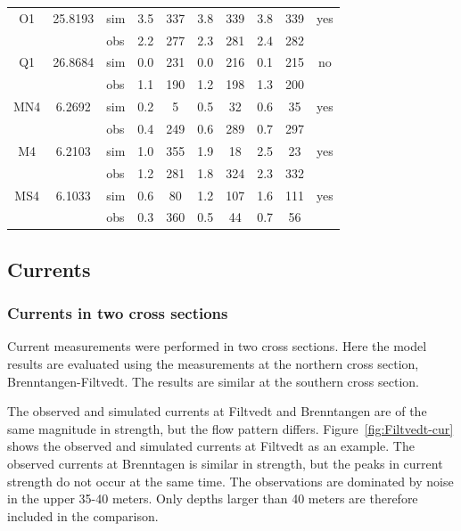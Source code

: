 \begin{table}[ht]
\begin{tabular}{|c|c|l|cc|cc|cc|c|}
\small O1   & 25.8193 	& sim & 3.5 & 337 & 3.8 & 339 & 3.8 & 339 & yes  \\
\small      &        	& obs & 2.2 & 277 & 2.3 & 281 & 2.4 & 282 &    \\
\small Q1   & 26.8684 	& sim & 0.0 & 231 & 0.0 & 216 & 0.1 & 215 & no   \\
\small      &        	& obs & 1.1 & 190 & 1.2 & 198 & 1.3 & 200 &    \\
\small MN4  & 6.2692 	& sim & 0.2 & 5 & 0.5 & 32 & 0.6 & 35 & yes  \\
\small      &        	& obs & 0.4 & 249 & 0.6 & 289 & 0.7 & 297 &    \\
\small M4   & 6.2103 	& sim & 1.0 & 355 & 1.9 & 18 & 2.5 & 23 & yes  \\
\small      &        	& obs & 1.2 & 281 & 1.8 & 324 & 2.3 & 332 &    \\
\small MS4  & 6.1033 	& sim & 0.6 & 80 & 1.2 & 107 & 1.6 & 111 & yes  \\
\small      &        	& obs & 0.3 & 360 & 0.5 & 44 & 0.7 & 56 &    \\
\hline
\end{tabular}
\end{table}



\clearpage 
\subsection{Currents}

\subsubsection{Currents in two cross sections}

Current measurements were performed in two cross sections. Here the model results are evaluated using the measurements at the northern cross section, Brenntangen-Filtvedt. The results are similar at the southern cross section.

The observed and simulated currents at Filtvedt and Brenntangen are of the same magnitude in strength, but the flow pattern differs. Figure~\ref{fig:Filtvedt-cur} shows the observed and simulated currents at Filtvedt as an example. The observed currents at Brenntagen is similar in strength, but the peaks in current strength do not occur at the same time. The observations are dominated by noise in the upper 35-40 meters. Only depths larger than 40 meters are therefore included in the comparison.

